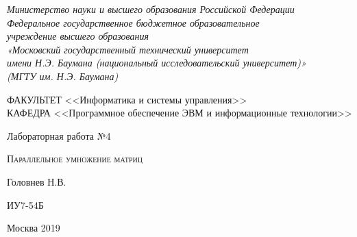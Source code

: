 \documentclass[a4paper,12pt]{article}
\begin{document}

\begin{titlepage}
\newpage

\begin{center}

\textit{Министерство науки и высшего образования Российской Федерации \\ 
Федеральное государственное бюджетное образовательное \\
учреждение высшего образования \\
«Московский государственный технический университет \\
имени Н.Э. Баумана (национальный исследовательский университет)» \\
(МГТУ им. Н.Э. Баумана) \\}
\hrulefill
\end{center}

\vspace{2em}

\begin{flushleft}
ФАКУЛЬТЕТ <<Информатика и системы управления>> \\
\vspace{0.5em}
КАФЕДРА <<Программное обеспечение ЭВМ и информационные технологии>>
\end{flushleft}


\vspace{8em}

\begin{center}
\LARGE Лабораторная работа №4 \\
\end{center}

\vspace{1.5em}

\begin{center}
\textsc{Параллельное умножение матриц}
\end{center}

\vspace{6em}

\begin{center}
Головнев Н.В.

\vspace{4em}

ИУ7-54Б
\end{center}

\vspace{\fill}

\begin{center}
Москва 2019
\end{center}

\end{titlepage}
\end{document}
